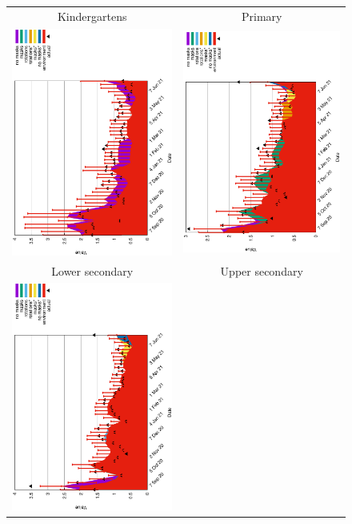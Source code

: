 \documentclass[fleqn,10pt]{wlscirep}
\begin{document}
\begin{figure}
\begin{center}
\begin{tabular}{cc}
Kindergartens & Primary  \\
\includegraphics[angle=270,width=6cm]{rho1h.eps} &\includegraphics[angle=270,width=6cm]{rho2h.eps}\\ 
 Lower secondary & Upper secondary \\
\includegraphics[angle=270,width=6cm]{rho3h.eps} & 

\end{tabular}
\end{center}
\end{figure}
\end{document}
